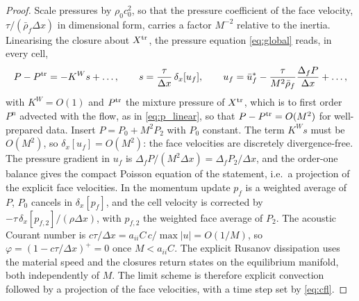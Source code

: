 \documentclass[a4paper,fleqn]{cas-sc}
\begin{document}
\begin{proof}
Scale pressures by $\rho_0c_0^2$, so that the pressure coefficient of the face velocity, $\tau/(\bar\rho_f\Delta x)$ in dimensional form, carries a
factor $M^{-2}$ relative to the inertia. Linearising the closure about $X^{\rm tr}$, the pressure equation \eqref{eq:global} reads, in every cell,
\[
P-P^{\rm tr}=-K^Ws+\dots,\qquad s=\frac\tau{\Delta x}\,\delta_x[u_f],\qquad u_f=\bar u^*_f-\frac{\tau}{M^2\bar\rho_f}\frac{\Delta_fP}{\Delta x}+\dots,
\]
with $K^W=O(1)$ and $P^{\rm tr}$ the mixture pressure of $X^{\rm tr}$, which is to first order $P^n$ advected with the flow, as in
\eqref{eq:p_linear}, so that $P-P^{\rm tr}=O(M^2)$ for well-prepared data. Insert $P=P_0+M^2P_2$ with $P_0$ constant. The term
$K^Ws$ must be $O(M^2)$, so $\delta_x[u_f]=O(M^2)$: the face velocities are discretely
divergence-free. The pressure gradient in $u_f$ is $\Delta_fP/(M^2\Delta x)=\Delta_fP_2/\Delta x$, and the order-one balance gives the compact Poisson
equation of the statement, i.e.\ a projection of the explicit face velocities. In the momentum update $p_f$ is a weighted average of
$P$, $P_0$ cancels in $\delta_x[p_f]$, and the cell velocity is corrected by $-\tau\,\delta_x[p_{f,2}]/(\rho\Delta x)$, with $p_{f,2}$ the weighted face
average of $P_2$. The acoustic Courant number is
$c\tau/\Delta x=a_{ii}C\,c/\max|u|=O(1/M)$, so $\varphi=(1-c\tau/\Delta x)^+=0$ once $M<a_{ii}C$. The explicit Rusanov dissipation uses the material
speed and the closures return states on the equilibrium manifold, both independently of $M$. The limit scheme is therefore
explicit convection followed by a projection of the face velocities, with a time step set by \eqref{eq:cfl}.
\end{proof}
\end{document}

